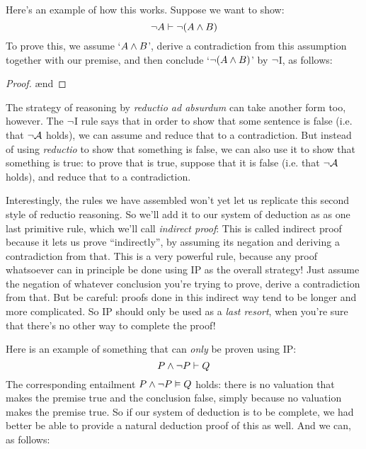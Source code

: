 Here's an example of how this works.  Suppose we want to show:
$$\neg A \vdash \neg(A \wedge B)$$
To prove this, we assume `$A \wedge B$', derive a contradiction from this assumption together with our premise, and then conclude `$\neg (A \wedge B)$' by $\neg$I, as follows:
\begin{proof}
	\open
	\ae{nd}
	\close
\end{proof}

The strategy of reasoning by \emph{reductio ad absurdum} can take another form too, however. The $\neg$I rule says that in order to show that some sentence  is false (i.e. that $\neg \mathcal{A}$ holds), we can assume  and reduce that to a contradiction.  But instead of using \emph{reductio} to show that something is false, we can also use it to show that something is true: to prove that  is true, suppose that it is false (i.e. that $\neg \mathcal{A}$ holds), and reduce that to a contradiction.



Interestingly, the rules we have assembled won't yet let us replicate this second style of reductio reasoning.  So we'll add it to our system of deduction as as one last primitive rule, which we'll call \emph{indirect proof}:
This is called indirect proof because it lets us prove  ``indirectly'', by assuming its negation and deriving a contradiction from that.  This is a very powerful rule, because any proof whatsoever can in principle be done using IP as the overall strategy!  Just assume the negation of whatever conclusion you're trying to prove, derive a contradiction from that.  But be careful: proofs done in this indirect way tend to be longer and more complicated.  So IP should only be used as a \emph{last resort}, when you're sure that there's no other way to complete the proof!

Here is an example of something that can \emph{only} be proven using IP:
$$P \wedge \neg P \vdash Q$$
The corresponding entailment $P \wedge \neg P \vDash Q$ holds: there is no valuation that makes the premise true and the conclusion false, simply because no valuation makes the premise true.  So if our system of deduction is to be complete, we had better be able to provide a natural deduction proof of this as well.  And we can, as follows:\\

